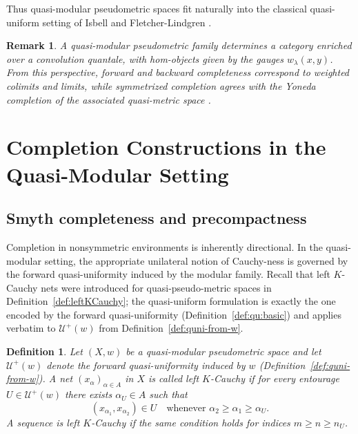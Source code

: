 \documentclass[preprint,12pt]{elsarticle}
\newtheorem{definition}[theorem]{Definition}
\newtheorem{remark}[theorem]{Remark}
\begin{document}
\noindent
Thus quasi-modular pseudometric spaces fit naturally into the classical
quasi-uniform setting of Isbell and Fletcher-Lindgren
\cite{FletcherLindgren,Isbell1964}.


\begin{remark}
\label{rem:yoneda}
A quasi-modular pseudometric family determines a category enriched over a
convolution quantale, with hom-objects given by the gauges
$w_\lambda(x,y)$.
From this perspective, forward and backward completeness correspond to
weighted colimits and limits, while symmetrized completion agrees with
the Yoneda completion of the associated quasi-metric space
\cite{Kelly1982,KunziSchellekens2002,Lawvere1973,Majozi2025,Rutten1998}.
\end{remark}


\section{Completion Constructions in the Quasi-Modular Setting}
\label{sec:completion}

\subsection{Smyth completeness and precompactness}
\label{ssec:smyth}

Completion in nonsymmetric environments is inherently directional.
In the quasi-modular setting, the appropriate unilateral notion of
Cauchy-ness is governed by the forward quasi-uniformity induced by the
modular family. Recall that left $K$-Cauchy nets were introduced for
quasi-pseudo-metric spaces in Definition~\ref{def:leftKCauchy}; the
quasi-uniform formulation is exactly the one encoded by the forward
quasi-uniformity (Definition~\ref{def:qu:basic}) and applies verbatim to
$\mathcal U^{+}(w)$ from Definition~\ref{def:quni-from-w}.

\begin{definition}
\label{def:leftKCauchy-modular}
Let $(X,w)$ be a quasi-modular pseudometric space and let
$\mathcal U^{+}(w)$ denote the forward quasi-uniformity induced by $w$
(Definition~\ref{def:quni-from-w}). A net $(x_\alpha)_{\alpha\in A}$ in
$X$ is called \emph{left $K$-Cauchy} if for every entourage
$U\in\mathcal U^{+}(w)$ there exists $\alpha_U\in A$ such that
\[
(x_{\alpha_1},x_{\alpha_2})\in U
\quad\text{whenever }\alpha_2\ge \alpha_1\ge \alpha_U.
\]
A sequence is left $K$-Cauchy if the same condition holds for indices
$m\ge n\ge n_U$.
\end{definition}
\end{document}
